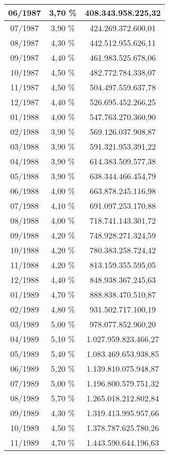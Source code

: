 \begin{center}
\begin{longtable}{|c|c|c|}
06/1987 & 3,70 \% & 408.343.958.225,32 \\ \hline
07/1987 & 3,90 \% & 424.269.372.600,01 \\ \hline
08/1987 & 4,30 \% & 442.512.955.626,11 \\ \hline
09/1987 & 4,40 \% & 461.983.525.678,06 \\ \hline
10/1987 & 4,50 \% & 482.772.784.338,07 \\ \hline
11/1987 & 4,50 \% & 504.497.559.637,78 \\ \hline
12/1987 & 4,40 \% & 526.695.452.266,25 \\ \hline
01/1988 & 4,00 \% & 547.763.270.360,90 \\ \hline
02/1988 & 3,90 \% & 569.126.037.908,87 \\ \hline
03/1988 & 3,90 \% & 591.321.953.391,22 \\ \hline
04/1988 & 3,90 \% & 614.383.509.577,38 \\ \hline
05/1988 & 3,90 \% & 638.344.466.454,79 \\ \hline
06/1988 & 4,00 \% & 663.878.245.116,98 \\ \hline
07/1988 & 4,10 \% & 691.097.253.170,88 \\ \hline
08/1988 & 4,00 \% & 718.741.143.301,72 \\ \hline
09/1988 & 4,20 \% & 748.928.271.324,59 \\ \hline
10/1988 & 4,20 \% & 780.383.258.724,42 \\ \hline
11/1988 & 4,20 \% & 813.159.355.595,05 \\ \hline
12/1988 & 4,40 \% & 848.938.367.245,63 \\ \hline
01/1989 & 4,70 \% & 888.838.470.510,87 \\ \hline
02/1989 & 4,80 \% & 931.502.717.100,19 \\ \hline
03/1989 & 5,00 \% & 978.077.852.960,20 \\ \hline
04/1989 & 5,10 \% & 1.027.959.823.466,27 \\ \hline
05/1989 & 5,40 \% & 1.083.469.653.938,85 \\ \hline
06/1989 & 5,20 \% & 1.139.810.075.948,87 \\ \hline
07/1989 & 5,00 \% & 1.196.800.579.751,32 \\ \hline
08/1989 & 5,70 \% & 1.265.018.212.802,84 \\ \hline
09/1989 & 4,30 \% & 1.319.413.995.957,66 \\ \hline
10/1989 & 4,50 \% & 1.378.787.625.780,26 \\ \hline
11/1989 & 4,70 \% & 1.443.590.644.196,63 \\ \hline

\end{longtable}
\end{center}

